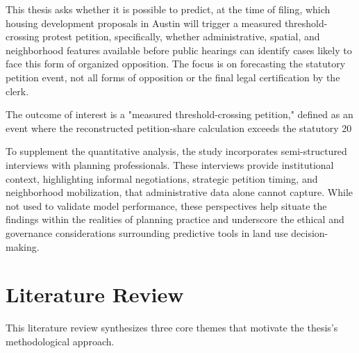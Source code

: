 \documentclass[11pt, letterpaper]{article}
\begin{document}
This thesis asks whether it is possible to predict, at the time of filing, which housing development proposals in Austin will trigger a measured threshold-crossing protest petition, specifically, whether administrative, spatial, and neighborhood features available before public hearings can identify cases likely to face this form of organized opposition. The focus is on forecasting the statutory petition event, not all forms of opposition or the final legal certification by the clerk.

The outcome of interest is a "measured threshold-crossing petition," defined as an event where the reconstructed petition-share calculation exceeds the statutory 20%

To supplement the quantitative analysis, the study incorporates semi-structured interviews with planning professionals. These interviews provide institutional context, highlighting informal negotiations, strategic petition timing, and neighborhood mobilization, that administrative data alone cannot capture. While not used to validate model performance, these perspectives help situate the findings within the realities of planning practice and underscore the ethical and governance considerations surrounding predictive tools in land use decision-making.

\section{Literature Review}

This literature review synthesizes three core themes that motivate the thesis's methodological approach.
\end{document}
